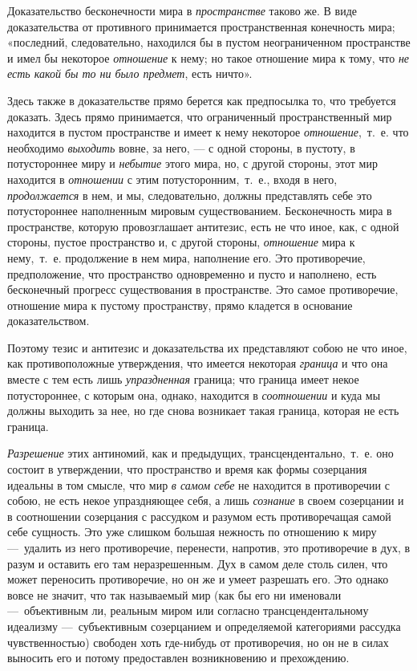 {Доказательство бесконечности мира в {\em пространстве}
таково же. В виде доказательства от противного принимается пространственная
конечность мира; «последний, следовательно, находился бы в пустом
неограниченном пространстве и имел бы некоторое
{\em отношение} к нему; но такое отношение мира к тому,
что {\em не есть какой бы то ни было предмет}, есть
ничто».

Здесь также в доказательстве прямо берется как предпосылка то, что требуется
доказать. Здесь прямо принимается, что ограниченный пространственный мир
находится в пустом пространстве и имеет к нему некоторое
{\em отношение},~т.~е. что необходимо
{\em выходить} вовне, за него, — с одной стороны, в
пустоту, в потустороннее миру и {\em небытие} этого
мира, но, с другой стороны, этот мир находится в
{\em отношении} с этим потусторонним,~т.~е., входя в
него, {\em продолжается} в нем, и мы, следовательно,
должны представлять себе это потустороннее наполненным мировым
существованием. Бесконечность мира в пространстве, которую провозглашает
антитезис, есть не что иное, как, с одной стороны, пустое пространство и, с
другой стороны, {\em отношение} мира к нему,~т.~е.
продолжение в нем мира, наполнение его. Это противоречие, предположение,
что пространство одновременно и пусто и наполнено, есть бесконечный
прогресс существования в пространстве. Это самое противоречие, отношение
мира к пустому пространству, прямо кладется в основание доказательством.

Поэтому тезис и антитезис и доказательства их представляют собою не что
иное, как противоположные утверждения, что имеется некоторая
{\em граница} и что она вместе с тем есть лишь
{\em упраздненная} граница; что граница имеет некое
потустороннее, с которым она, однако, находится в
{\em соотношении} и куда мы должны выходить за нее, но
где снова возникает такая граница, которая не есть граница.

{\em Разрешение} этих антиномий, как и предыдущих,
трансцендентально,~т.~е. оно состоит в утверждении, что пространство и
время как формы созерцания идеальны в том смысле, что мир
{\em в самом себе} не находится в противоречии с собою,
не есть некое упраздняющее себя, а лишь {\em сознание}
в своем созерцании и в соотношении созерцания с рассудком и разумом есть
противоречащая самой себе сущность. Это уже слишком большая нежность по
отношению к миру —~удалить из него противоречие, перенести, напротив, это
противоречие в дух, в разум и оставить его там неразрешенным. Дух в самом
деле столь силен, что может переносить противоречие, но он же и умеет
разрешать его. Это однако вовсе не значит, что так называемый мир (как бы
его ни именовали —~объективным ли, реальным миром или согласно
трансцендентальному идеализму —~субъективным созерцанием и определяемой
категориями рассудка чувственностью) свободен хоть где-нибудь от
противоречия, но он не в силах выносить его и потому предоставлен
возникновению и прехождению.

}
